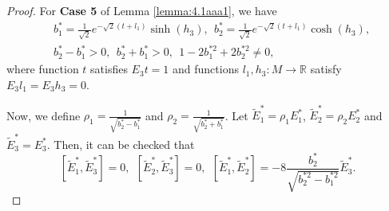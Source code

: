 \documentclass[reqno]{amsart}%
\theoremstyle{definition}
\numberwithin{equation}{section}
\begin{document}
%
\begin{proof}
For {\bf Case 5} of Lemma \ref{lemma:4.1aaa1}, we have
$$
\begin{aligned}
&b_1^*=\frac{1}{\sqrt{2}}e^{-\sqrt{2}(t+l_1)}\sinh(h_3),\ \
b_2^*=\frac{1}{\sqrt{2}}e^{-\sqrt{2}(t+l_1)}\cosh(h_3),\\
&b_2^*-b_1^*>0,\ \ b_2^*+b_1^*>0,\ \ 1-2b_1^{*2}+2b_2^{*2}\neq0,
\end{aligned}
$$
where function $t$ satisfies $E_3t=1$ and functions $l_1, h_3:M\rightarrow \mathbb{R}$
satisfy $E_3l_1=E_3h_3=0$.



Now, we define $\rho_1=\frac{1}{\sqrt{b_2^*-b_1^*}}$ and $\rho_2=\frac{1}{\sqrt{b_2^*+b_1^*}}$.
Let $\tilde{E}_1^*=\rho_1E_1^*$, $\tilde{E}_2^*=\rho_2E_2^*$ and $\tilde{E}_3^*=E_3^*$.
Then, it can be checked that
\begin{equation}\label{eqn:Lietilde5}
[\tilde{E}_1^*,\tilde{E}_3^*]=0,\ \ [\tilde{E}_2^*,\tilde{E}_3^*]=0,\ \
[\tilde{E}_1^*,\tilde{E}_2^*]=-8\frac{b_2^*}{\sqrt{b_2^{*2}-b_1^{*2}}}\tilde{E}_3^*.
\end{equation}


\end{proof}
\end{document}
